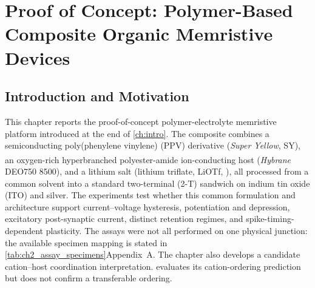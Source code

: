 \documentclass[12pt, twoside]{report}
\begin{document}
  \setcounter{chapter}{1}     %
\fi


\newcommand{\SY}{\textit{Super Yellow}}
\newcommand{\HybraneFull}{\textit{Hybrane}\textsuperscript{\textregistered} DEO750 8500} %
\newcommand{\Hybrane}{\textit{Hybrane}} %
\newcommand{\LiTf}{LiOTf}     %
\newcommand{\STM}{short-term memory}
\newcommand{\LTM}{long-term memory}
\newcommand{\STDP}{STDP}      %
\newcommand{\EPSC}{EPSC}      %
\newcommand{\ITO}{ITO}        %
\newcommand{\twoterminal}{two-terminal}
\newcommand{\chTwoSIRef}[1]{\ifdefined\thesismode\cref{#1}\else Appendix~A\fi}

\chapter{Proof of Concept: Polymer-Based Composite Organic Memristive Devices}\label{ch:poc}

\section{Introduction and Motivation}\label{sec:ch2_intro}

This chapter reports the proof-of-concept polymer-electrolyte memristive platform introduced at the end of \cref{ch:intro}. The composite combines a semiconducting poly(phenylene vinylene) (PPV) derivative (\SY{}, SY), an oxygen-rich hyperbranched polyester-amide ion-conducting host (\HybraneFull{}), and a lithium salt (lithium triflate, \LiTf{}, ), all processed from a common solvent into a standard \twoterminal{} (2-T) sandwich on indium tin oxide (\ITO{}) and silver. The experiments test whether this common formulation and architecture support current--voltage hysteresis, potentiation and depression, excitatory post-synaptic current, distinct retention regimes, and spike-timing-dependent plasticity. The assays were not all performed on one physical junction: the available specimen mapping is stated in \chTwoSIRef{tab:ch2_assay_specimens}. The chapter also develops a candidate cation--host coordination interpretation.  evaluates its cation-ordering prediction but does not confirm a transferable ordering.
\end{document}
